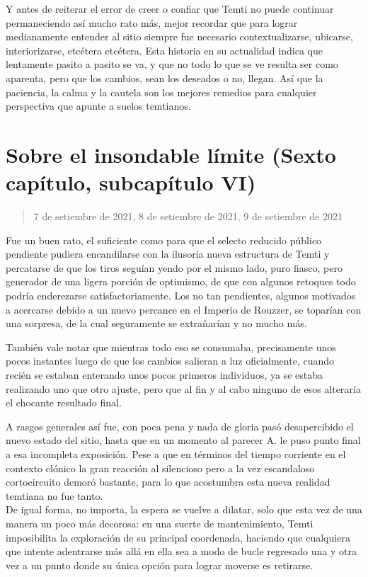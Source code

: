 \documentclass[
  spanish,
]{book}
\begin{document}
Y antes de reiterar el error de creer o confiar que Temti no puede continuar permaneciendo así mucho rato más, mejor recordar que para lograr medianamente entender al sitio siempre fue necesario contextualizarse, ubicarse, interiorizarse, etcétera etcétera. Esta historia en su actualidad indica que lentamente pasito a pasito se va, y que no todo lo que se ve resulta ser como aparenta, pero que los cambios, sean los deseados o no, llegan. Así que la paciencia, la calma y la cautela son los mejores remedios para cualquier perspectiva que apunte a suelos temtianos.

\hypertarget{sobre-el-insondable-luxedmite-sexto-capuxedtulo-subcapuxedtulo-vi}{%
\section{Sobre el insondable límite (Sexto capítulo, subcapítulo VI)}\label{sobre-el-insondable-luxedmite-sexto-capuxedtulo-subcapuxedtulo-vi}}

\begin{quote}
7 de setiembre de 2021, 8 de setiembre de 2021, 9 de setiembre de 2021
\end{quote}

Fue un buen rato, el suficiente como para que el selecto reducido público pendiente pudiera encandilarse con la ilusoria nueva estructura de Temti y percatarse de que los tiros seguían yendo por el mismo lado, puro fiasco, pero generador de una ligera porción de optimismo, de que con algunos retoques todo podría enderezarse satisfactoriamente. Los no tan pendientes, algunos motivados a acercarse debido a un nuevo percance en el Imperio de Rouzzer, se toparían con una sorpresa, de la cual seguramente se extrañarían y no mucho más.

También vale notar que mientras todo eso se consumaba, precisamente unos pocos instantes luego de que los cambios salieran a luz oficialmente, cuando recién se estaban enterando unos pocos primeros individuos, ya se estaba realizando uno que otro ajuste, pero que al fin y al cabo ninguno de esos alteraría el chocante resultado final.

A rasgos generales así fue, con poca pena y nada de gloria pasó desapercibido el nuevo estado del sitio, hasta que en un momento al parecer A. le puso punto final a esa incompleta exposición. Pese a que en términos del tiempo corriente en el contexto clónico la gran reacción al silencioso pero a la vez escandaloso cortocircuito demoró bastante, para lo que acostumbra esta nueva realidad temtiana no fue tanto.\\
De igual forma, no importa, la espera se vuelve a dilatar, solo que esta vez de una manera un poco más decorosa: en una suerte de mantenimiento, Temti imposibilita la exploración de su principal coordenada, haciendo que cualquiera que intente adentrarse más allá en ella sea a modo de bucle regresado una y otra vez a un punto donde su única opción para lograr moverse es retirarse.
\end{document}
